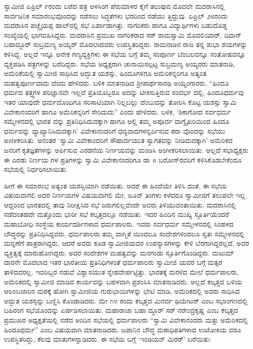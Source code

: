 ಸ್ವಾಮೀಜಿ ಏಪ್ರಿಲ್ ೯ರಂದು ಬರೆದ ಪತ್ರ ಅಳಸಿಂಗ ಪೆರುಮಾಳರ ಕೈಗೆ ತಲುಪುವ ಮೊದಲೇ ಮದರಾಸಿನಲ್ಲಿ ಸಾರ್ವಜನಿಕ ಸಮಾರಂಭವೊಂದನ್ನು ನಡೆಸಲು ಸಿದ್ಧತೆಗಳು ಭರದಿಂದ ನಡೆಯು ತ್ತಿದ್ದುವು. ಏಪ್ರಿಲ್ ೨೮ರಂದು ಮದರಾಸಿನ ಪಚ್ಚೈಯಪ್ಪ ಹಾಲ್​ನಲ್ಲಿ ಸಭೆ ಏರ್ಪಾಡಾಗಿತ್ತು. ನಾಗರಿಕರು ಹಾಗೂ ವಿದ್ಯಾರ್ಥಿಗಳು ಬಹುದೊಡ್ಡ ಸಂಖ್ಯೆಯಲ್ಲಿ ಭಾಗವಹಿಸಿದ್ದರು. ಮದರಾಸಿನ ಪ್ರಮುಖ ನಾಗರಿಕರಾದ ಸರ್ ರಾಮಸ್ವಾಮಿ ಮೊದಲಿಯಾರ್, ದಿವಾನ್ ಬಹಾದ್ದೂರ್ ಸುಬ್ರಮಣ್ಯ ಅಯ್ಯರ್ ಮೊದಲಾದವರು ಉಪಸ್ಥಿತರಿದ್ದರು. ರಾಮನಾಡಿನ ರಾಜ ತನ್ನ ಶುಭಾ ಶಯಗಳನ್ನು ಕಳಿಸಿದ್ದ. ಅಲ್ಲದೆ ಇನ್ನೂ ಅನೇಕ ಗಣ್ಯವ್ಯಕ್ತಿಗಳು ಈ ಸಭೆಯ ಬಗ್ಗೆ ತಮ್ಮ ಸಂಪೂರ್ಣ ಬೆಂಬಲವನ್ನೂ ಸಂತೋಷವನ್ನೂ ವ್ಯಕ್ತಪಡಿಸಿ ಪತ್ರಗಳನ್ನು ಬರೆದಿದ್ದರು. ಸಭೆಯ ಅಧ್ಯಕ್ಷರಾಗಿ ಚುನಾಯಿಸಲ್ಪಟ್ಟ ಸುಬ್ರಮಣ್ಯ ಅಯ್ಯರರು ಮಾತನಾಡಿ, ಅಮೆರಿಕೆಯಲ್ಲಿ ಸ್ವಾಮೀಜಿ ಸಾಧಿಸಿದ ಅದ್ಭುತ ಯಶಸ್ಸು, ಹಿಂದೂಗಳಿಗೂ ಅಮೆರಿಕನ್ನರಿಗೂ ಅತ್ಯಂತ ಮಹತ್ವಪೂರ್ಣವಾದು ದೆಂದು ಹೇಳಿದರು. ಬಳಿಕ ಮಾತನಾಡಿದ ಶ್ರೀಪಾರ್ಥಸಾರಥಿ ಅಯ್ಯಂಗಾರರು, “ಹಿಂದೂ ಧರ್ಮದ ತತ್ತ್ವಗಳ ಪರಿಜ್ಞಾನವೇ ಇಲ್ಲದೆ ಪ್ರತಿಯೊಬ್ಬರೂ ಅದನ್ನು ಟೀಕಿಸುತ್ತಿರುವ ಸಂದರ್ಭ ದಲ್ಲಿ, ಹಿಂದೂಧರ್ಮವು ಇತರ ಯಾವುದೇ ಧರ್ಮದೊಂದಿಗೂ ಸರಿಸಾಟಿಯಾಗಿ ನಿಲ್ಲಬಲ್ಲು ದೆಂಬುದನ್ನು ತೋರಿಸಿ ಕೊಟ್ಟ ಯಶಸ್ಸು ಸ್ವಾಮಿ ವಿವೇಕಾನಂದರಿಗೆ ಹಾಗೂ ಅಮೆರಿಕನ್ನರಿಗೆ ಸೇರಿದುದು” ಎಂದು ಹೇಳಿದರು. ಬಳಿಕ, ‘ಶಿಕಾಗೋದ ಸರ್ವಧರ್ಮ ಸಮ್ಮೇಳನದಲ್ಲಿ ಭಾರತ ವನ್ನು ಪ್ರತಿನಿಧಿಸಿದುದಕ್ಕಾಗಿ ಹಾಗೂ ಅಲ್ಲಿ ತಮ್ಮ ಅಪೂರ್ವ ವಾಗ್ವೈಖರಿಯಿಂದ ಹಿಂದೂ ಧರ್ಮವನ್ನು ವ್ಯಾಖ್ಯಾನಿಸಿದುದಕ್ಕಾಗಿ’ ವಿವೇಕಾನಂದರಿಗೆ ಧನ್ಯವಾದಗಳನ್ನರ್ಪಿಸುವ ಠರಾ ವೊಂದನ್ನು ಸಭೆಯು ಅಂಗೀಕರಿಸಿತು. ಅನಂತರ ‘ಸ್ವಾಮಿ ವಿವೇಕಾಂದರಿಗೆ ಸೌಹಾರ್ದಯುತ ಸ್ವಾಗತವನ್ನು ನೀಡಿದುದಕ್ಕಾಗಿ’ ಅಮೆರಿಕದ ಜನರಿಗೆ ಕೃತಜ್ಞತೆಗಳನ್ನು ಅರ್ಪಿಸುವ ಎರಡನೆಯ ನಿರ್ಣಯವನ್ನು ಮಂಡಿಸಿ ಅಂಗೀಕರಿಸಲಾಯಿತು. ಅಲ್ಲದೆ ಸಭಾಧ್ಯಕ್ಷರು ಈ ಎರಡು ನಿರ್ಣಯ ಗಳ ಪ್ರತಿಗಳನ್ನು ಸ್ವಾಮಿ ವಿವೇಕಾನಂದರಿಗೂ ಡಾ ॥ ಬರೋಸ್​ರವರಿಗೆ ಕಳಿಸಿಕೊಡಬೇಕೆಂದೂ ಸಭೆಯಲ್ಲಿ ನಿರ್ಧರಿಸಲಾಯಿತು.

ಹೀಗೆ ಈ ಸಮಾರಂಭ ಅತ್ಯಂತ ಯಶಸ್ವಿಯಾಗಿ ನಡೆಯಿತು. ಆದರೆ ಈ ಹಿಂದೆಯೇ ತಿಳಿಸಿ ದಂತೆ, ಈ ಸಭೆಯ ವಿಷಯವಾಗಲಿ ಅದರ ನಿರ್ಣಯಗಳ ವಿಷಯವಾಗಲಿ ಮೇ, ಜೂನ್ ತಿಂಗಳು ಕಳೆದರೂ ಸ್ವಾಮೀಜಿಗೆ ತಲುಪಲೇ ಇಲ್ಲ. ಆದ್ದರಿಂದ ಭಾರತದಲ್ಲಿ ತಾವು ನಿರೀಕ್ಷಿಸಿದ ಸಭೆ ಜರುಗಲಿಲ್ಲವೆಂದೇ ಅವರು ತಿಳಿಯುವಂತಾಯಿತು. ಮದರಾಸಿನಲ್ಲಿ ನಡೆದಂತಹದೇ ಮತ್ತೊಂದು ಭಾರೀ ಸಭೆ ಕಲ್ಕತ್ತದಲ್ಲೂ ನಡೆಯಿತು. ಇದರ ಹಿಂದಿನ ಮುಖ್ಯ ಸ್ಫೂರ್ತಿಯೆಂದರೆ ಮಹಾಬೋಧಿ ಸಂಸ್ಥೆಯ ಕಾರ್ಯದರ್ಶಿಗಳಾದ ಧರ್ಮಪಾಲರು. ಇವರು ಸರ್ವಧರ್ಮ ಸಮ್ಮೇಳನದಲ್ಲಿ ಸಿಂಹಳದ ಬೌದ್ಧರನ್ನು ಪ್ರತಿನಿಧಿಸಿದ್ದವರು. ಧರ್ಮಪಾಲರು ತಮ್ಮ ವಾಗ್ಮಿತೆ ಯಿಂದಲೂ ಸಂದೇಶಗಳಿಂದಲೂ ಸ್ವತಃ ಸಮ್ಮೇಳನದಲ್ಲಿ ಮನ್ನಣೆಗೆ ಪಾತ್ರರಾಗಿದ್ದರು. ಆದರೆ ಅವರು ಕೂಡ ಸ್ವಾಮೀಜಿಯವರ ಉಪನ್ಯಾಸಗಳನ್ನು ಕೇಳಿ ಬೆರಗಾಗಿದ್ದರಲ್ಲದೆ, ಅವರ ವ್ಯಕ್ತಿತ್ವಕ್ಕೆ ಮಾರುಹೋಗಿದ್ದರು; ಅವರ ಸಂದೇಶಗಳ ಮಹತ್ವವನ್ನು ಮನಗಂಡು ಸ್ಫೂರ್ತಿಗೊಂಡಿದ್ದರು. ಮಜುಮ್​ದಾರನೇ ಮೊದಲಾದ ಇತರ ಭಾರತೀಯ ಪ್ರತಿನಿಧಿಗಳಂತೆ ಧರ್ಮಪಾಲರು ಸ್ವಾಮೀಜಿ ಯವರ ಬಗ್ಗೆ ಮತ್ಸರ ತಾಳಿದವರಲ್ಲ. ಇವರಿಬ್ಬರ ನಡುವೆ ವಿಶ್ವಾಸಯುತ ಸ್ನೇಹವೇರ್ಪಟ್ಟಿತ್ತು. ಭಾರತಕ್ಕೆ ಮರಳಿದ ಮೇಲೆ ಧರ್ಮಪಾಲರು, ಅಮೆರಿಕದಲ್ಲಿ ಸ್ವಾಮೀಜಿ ಮಾಡಿದ ಕಾರ್ಯವನ್ನು ಬಹಳವಾಗಿ ಪ್ರಶಂಸಿಸಿ ಮಾತನಾಡಿದರು. ಅಲ್ಲದೆ ಕಲ್ಕತ್ತದ ಬಳಿಯ ಆಲಂಬಜಾರಿನ ಮಠಕ್ಕೆ ಹೋಗಿ ಸ್ವಾಮೀಜಿಯ ಗುರುಭಾಯಿಗಳನ್ನು ಭೇಟಿ ಮಾಡಿ, ಅಮೆರಿಕದಲ್ಲಿ ಅವರು ಸಾಧಿಸಿದ ಅದ್ಭುತ ಯಶಸ್ಸನ್ನು ಬಣ್ಣಿಸಿ ಕೊಂಡಾಡಿದರು. ಮೇ ೧೪ ರಂದು ಕಲ್ಕತ್ತದ ಮಿನರ್ವ ಥಿಯೇಟರ್ ಎಂಬ ಸಭಾಂಗಣದಲ್ಲಿ ಬಹಿರಂಗ ಸಭೆಯೊಂದನ್ನು ಏರ್ಪಡಿಸಲಾಯಿತು. ಮಹಾರಾಜಾ ಬಹಾ ದ್ದೂರ್ ಸರ್ ನರೇಂದ್ರಕೃಷ್ಣ ಎಂಬ ಕಲ್ಕತ್ತದ ಪ್ರಮುಖರ ಅಧ್ಯಕ್ಷತೆಯಲ್ಲಿ ನಡೆದ ಅಂದಿನ ಸಭೆಯಲ್ಲಿ ಧರ್ಮಪಾಲರು “ಸ್ವಾಮಿ ವಿವೇಕಾನಂದರು ಮತ್ತು ಅಮೆರಿಕದಲ್ಲಿ ಹಿಂದೂಧರ್ಮ” ಎಂಬ ವಿಷಯವಾಗಿ ಮಾತನಾಡಿದರು. ಜಪಾನಿನ ಬೌದ್ಧ ಮಠಾಧಿಪತಿಗಳಾದ ಉಟೋಕಿಯ ವರೂ ಉಪಸ್ಥಿತರಿದ್ದು, ಕೆಲವು ಮಾತುಗಳನ್ನಾಡಿದರು. ಈ ಸಭೆಯ ಬಗ್ಗೆ ‘ಇಂಡಿಯನ್ ಮಿರರ್​’ ಬರೆಯಿತು:

